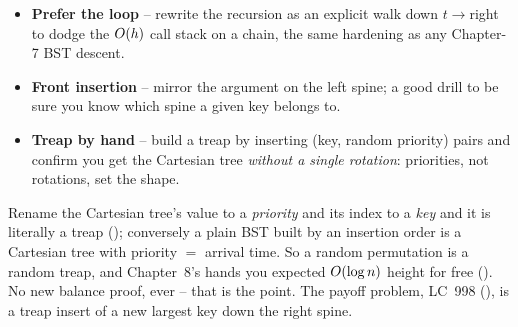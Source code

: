 \begin{hardeningbox}
\begin{itemize}[nosep, leftmargin=1.4em]
  \item \textbf{Prefer the loop} -- rewrite the recursion as an explicit walk down $t\to$right to dodge the
        $O(h)$ call stack on a chain, the same hardening as any Chapter-7 BST descent.
  \item \textbf{Front insertion} -- mirror the argument on the left spine; a good drill to be sure you know
        which spine a given key belongs to.
  \item \textbf{Treap by hand} -- build a treap by inserting (key, random priority) pairs and confirm you
        get the Cartesian tree \emph{without a single rotation}: priorities, not rotations, set the shape.
\end{itemize}
\end{hardeningbox}

\begin{recallbox}
Rename the Cartesian tree's value to a \emph{priority} and its index to a \emph{key} and it is literally a
treap (); conversely a plain BST built by an insertion order is a Cartesian tree
with priority $=$ arrival time. So a random permutation is a random treap, and Chapter~8's
 hands you expected $O(\log n)$ height for free (). No new
balance proof, ever -- that is the point. The payoff problem, LC~998 (), is a treap
insert of a new largest key down the right spine.
\end{recallbox}
